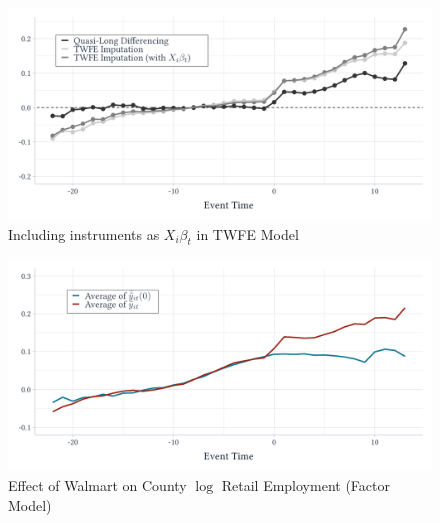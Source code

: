 \documentclass[aspectratio=169,t,11pt]{beamer}
\begin{document}
\begin{frame}{}
  \vspace{-\bigskipamount}
  \begin{figure}
    \caption{Including instruments as $X_i \beta_t$ in TWFE Model}
    \begin{adjustbox}{width=0.9\textwidth}
      \includegraphics{../figures/retail_covs.pdf}
    \end{adjustbox}
  \end{figure}
\end{frame}

\begin{frame}{}
  \vspace{-\bigskipamount}
  \begin{figure}
    \caption{Effect of Walmart on County $\log$ Retail Employment (Factor Model)}
    \begin{adjustbox}{width=0.85\textwidth}
      \includegraphics{../figures/synth_retail.pdf}
    \end{adjustbox}
  \end{figure}
\end{frame}
\end{document}
